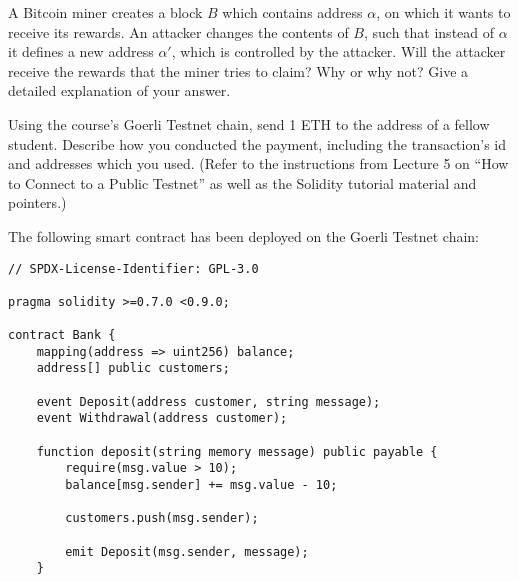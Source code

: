 \documentclass[12pt,addpoints,answers]{exam}
\begin{document}
\begin{questions}


\newpage

\question[10] A Bitcoin miner creates a block $B$ which contains address $\alpha$, on which it wants to receive its rewards. An attacker changes the contents of $B$, such that instead of $\alpha$ it defines a new address $\alpha'$, which is controlled by the attacker. Will the attacker receive the rewards that the miner tries to claim? Why or why not? Give a detailed explanation of your answer.



\newpage

\question[10] Using the course’s Goerli  Testnet chain, send 1 ETH to the address of a fellow student. Describe how you conducted the payment, including the transaction’s id and addresses which you used. (Refer to the instructions from Lecture 5 on ``How to Connect to a Public Testnet'' as well as the Solidity tutorial material and pointers.)



\newpage

\question The following smart contract has been deployed on the Goerli Testnet chain:

{\footnotesize

\begin{verbatim}
// SPDX-License-Identifier: GPL-3.0

pragma solidity >=0.7.0 <0.9.0;

contract Bank {
    mapping(address => uint256) balance;
    address[] public customers;

    event Deposit(address customer, string message);
    event Withdrawal(address customer);

    function deposit(string memory message) public payable {
        require(msg.value > 10);
        balance[msg.sender] += msg.value - 10;

        customers.push(msg.sender);

        emit Deposit(msg.sender, message);
    }


\end{verbatim}}
\end{questions}
\end{document}
